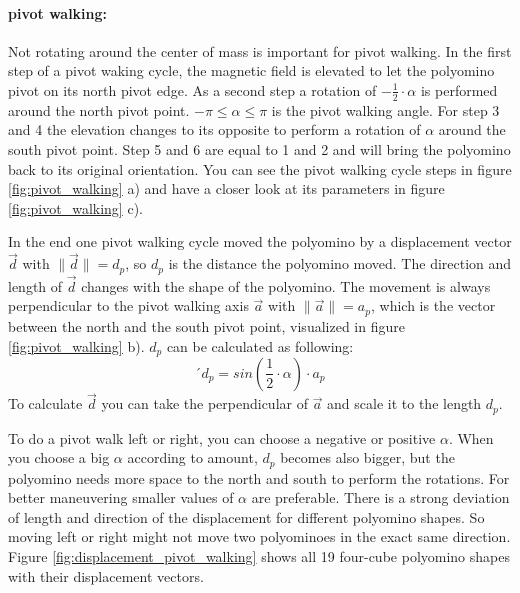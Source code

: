 \paragraph{pivot walking:}
Not rotating around the center of mass is important for pivot walking.
In the first step of a pivot waking cycle, the magnetic field is elevated to let the polyomino pivot on its north pivot edge.
As a second step a rotation of $-\frac{1}{2} \cdot \alpha$ is performed around the north pivot point.
$-\pi \leq \alpha \leq \pi$ is the pivot walking angle.
For step 3 and 4 the elevation changes to its opposite to perform a rotation of $\alpha$ around the south pivot point.
Step 5 and 6 are equal to 1 and 2 and will bring the polyomino back to its original orientation.
You can see the pivot walking cycle steps in figure \ref{fig:pivot_walking} a) and have a closer look at its parameters in figure \ref{fig:pivot_walking} c).

In the end one pivot walking cycle moved the polyomino by a displacement vector $\vec{d}$ with $\lVert \vec{d} \rVert = d_p$, so $d_p$ is the distance the polyomino moved.
The direction and length of $\vec{d}$ changes with the shape of the polyomino.
The movement is always perpendicular to the pivot walking axis $\vec{a}$ with $\lVert \vec{a} \rVert = a_p$, which is the vector between the north and the south pivot point, visualized in figure \ref{fig:pivot_walking} b).
$d_p$ can be calculated as following:
\begin{equation*}´
d_p = sin(\frac{1}{2} \cdot \alpha) \cdot a_p
\end{equation*}
To calculate $\vec{d}$ you can take the perpendicular of $\vec{a}$ and scale it to the length $d_p$.

To do a pivot walk left or right, you can choose a negative or positive $\alpha$.
When you choose a big $\alpha$ according to amount, $d_p$ becomes also bigger, but the polyomino needs more space to the north and south to perform the rotations.
For better maneuvering smaller values of $\alpha$ are preferable.
There is a strong deviation of length and direction of the displacement for different polyomino shapes.
So moving left or right might not move two polyominoes in the exact same direction.
Figure \ref{fig:displacement_pivot_walking} shows all 19 four-cube polyomino shapes with their displacement vectors.

